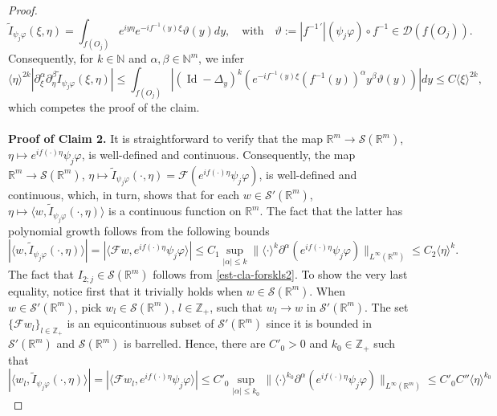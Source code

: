 \documentclass[12pt,reqno]{amsart}
\newcommand{\NN}{\mathbb N}
\newcommand{\RR}{\mathbb R}
\newcommand{\ZZ}{\mathbb Z}
\newcommand{\DD}{\mathcal D}
\newcommand{\SSS}{\mathcal S}
\theoremstyle{plain}
\theoremstyle{remark}
\theoremstyle{definition}
\numberwithin{equation}{section}
\begin{document}
\begin{proof}
\begin{equation*}
\widetilde{I}_{\psi_j\varphi}(\xi,\eta)=\int_{f(O_j)} e^{i y\eta}e^{-if^{-1}(y)\xi} \vartheta(y)dy,\quad \mbox{with}\quad \vartheta:=|f^{-1\, '}| (\psi_j\varphi)\circ f^{-1}\in\DD(f(O_j)).
\end{equation*}
Consequently, for $k\in\NN$ and $\alpha,\beta\in\NN^m$, we infer
\begin{equation*}
\langle\eta\rangle^{2k}|\partial^{\alpha}_{\xi}\partial^{\beta}_{\eta}\widetilde{I}_{\psi_j\varphi}(\xi,\eta)|\leq\int_{f(O_j)} \left|(\operatorname{Id}-\Delta_y)^k\left(e^{-if^{-1}(y)\xi} (f^{-1}(y))^{\alpha}y^{\beta}\vartheta(y)\right)\right|dy\leq C\langle\xi\rangle^{2k},
\end{equation*}
which competes the proof of the claim.\\
\\
\noindent \textbf{Proof of Claim 2.} It is straightforward to verify that the map $\RR^m\rightarrow\SSS(\RR^m)$, $\eta\mapsto e^{if(\cdot)\eta}\psi_j\varphi$, is well-defined and continuous. Consequently, the map $\RR^m\rightarrow\SSS(\RR^m)$, $\eta\mapsto \widetilde{I}_{\psi_j\varphi}(\cdot,\eta)=\mathcal{F}(e^{if(\cdot)\eta}\psi_j\varphi)$, is well-defined and continuous, which, in turn, shows that for each $w\in\SSS'(\RR^m)$, $\eta\mapsto \langle w, \widetilde{I}_{\psi_j\varphi}(\cdot,\eta)\rangle$ is a continuous function on $\RR^m$. The fact that the latter has polynomial growth follows from the following bounds
\begin{equation*}
|\langle w,\widetilde{I}_{\psi_j\varphi}(\cdot,\eta)\rangle|=|\langle \mathcal{F}w,e^{i f(\cdot)\eta}\psi_j\varphi\rangle|\leq C_1\sup_{|\alpha|\leq k}\|\langle\cdot\rangle^k\partial^{\alpha}(e^{if(\cdot)\eta}\psi_j\varphi)\|_{L^{\infty}(\RR^m)}\leq C_2\langle\eta\rangle^k.
\end{equation*}
The fact that $I_{2;j}\in\SSS(\RR^m)$ follows from \eqref{est-cla-forskls2}. To show the very last equality, notice first that it trivially holds when $w\in\SSS(\RR^m)$. When $w\in\SSS'(\RR^m)$, pick $w_l\in\SSS(\RR^m)$, $l\in\ZZ_+$, such that $w_l\rightarrow w$ in $\SSS'(\RR^m)$. The set $\{\mathcal{F}w_l\}_{l\in\ZZ_+}$ is an equicontinuous subset of $\SSS'(\RR^m)$ since it is bounded in $\SSS'(\RR^m)$ and $\SSS(\RR^m)$ is barrelled. Hence, there are $C'_0>0$ and $k_0\in\ZZ_+$ such that
\begin{equation*}
|\langle w_l,\widetilde{I}_{\psi_j\varphi}(\cdot,\eta)\rangle|=|\langle \mathcal{F}w_l,e^{i f(\cdot)\eta}\psi_j\varphi\rangle|\leq C'_0\sup_{|\alpha|\leq k_0}\|\langle\cdot\rangle^{k_0}\partial^{\alpha}(e^{if(\cdot)\eta}\psi_j\varphi)\|_{L^{\infty}(\RR^m)}\leq C'_0C''\langle\eta\rangle^{k_0}

\end{equation*}
\end{proof}
\end{document}
